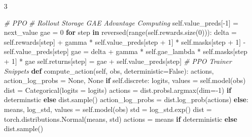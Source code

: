 \documentclass{article}
\newenvironment{Shaded}{\CodeFontSize\setlength{\topsep}{\CodeBlockSkip}\setlength{\partopsep}{0pt}}{}
\newcommand{\BuiltInTok}[1]{\textcolor[rgb]{0.00,0.50,0.00}{#1}}
\newcommand{\CommentTok}[1]{\textcolor[rgb]{0.38,0.63,0.69}{\textit{#1}}}
\newcommand{\ControlFlowTok}[1]{\textcolor[rgb]{0.00,0.44,0.13}{\textbf{#1}}}
\newcommand{\DecValTok}[1]{\textcolor[rgb]{0.25,0.63,0.44}{#1}}
\newcommand{\KeywordTok}[1]{\textcolor[rgb]{0.00,0.44,0.13}{\textbf{#1}}}
\newcommand{\NormalTok}[1]{#1}
\newcommand{\OperatorTok}[1]{\textcolor[rgb]{0.40,0.40,0.40}{#1}}
\newcommand{\VariableTok}[1]{\textcolor[rgb]{0.10,0.09,0.49}{#1}}
\newcommand{\CodeFontSize}{\fontsize{4.8}{5.6}\selectfont}
\newcommand{\NumColumns}{3}  %
\newlength{\CodeBlockSkip}
\begin{document}
\begin{multicols*}{\NumColumns}
\begin{Shaded}
\begin{Highlighting}[]
\CommentTok{\# PPO}
\CommentTok{\# Rollout Storage GAE Advantage Computing}
\VariableTok{self}\NormalTok{.value\_preds[}\OperatorTok{{-}}\DecValTok{1}\NormalTok{] }\OperatorTok{=}\NormalTok{ next\_value}
\NormalTok{gae }\OperatorTok{=} \DecValTok{0}
\ControlFlowTok{for}\NormalTok{ step }\KeywordTok{in} \BuiltInTok{reversed}\NormalTok{(}\BuiltInTok{range}\NormalTok{(}\VariableTok{self}\NormalTok{.rewards.size(}\DecValTok{0}\NormalTok{))):}
\NormalTok{  delta }\OperatorTok{=} \VariableTok{self}\NormalTok{.rewards[step] }\OperatorTok{+}\NormalTok{ gamma }\OperatorTok{*} \VariableTok{self}\NormalTok{.value\_preds[step }\OperatorTok{+} \DecValTok{1}\NormalTok{] }\OperatorTok{*} \VariableTok{self}\NormalTok{.masks[step }\OperatorTok{+} \DecValTok{1}\NormalTok{] }\OperatorTok{{-}} \VariableTok{self}\NormalTok{.value\_preds[step]}
\NormalTok{  gae }\OperatorTok{=}\NormalTok{ delta }\OperatorTok{+}\NormalTok{ gamma }\OperatorTok{*} \VariableTok{self}\NormalTok{.gae\_lambda }\OperatorTok{*} \VariableTok{self}\NormalTok{.masks[step }\OperatorTok{+} \DecValTok{1}\NormalTok{] }\OperatorTok{*}\NormalTok{ gae}
  \VariableTok{self}\NormalTok{.returns[step] }\OperatorTok{=}\NormalTok{ gae }\OperatorTok{+} \VariableTok{self}\NormalTok{.value\_preds[step]}
\CommentTok{\# PPO Trainer Snippets}
\KeywordTok{def}\NormalTok{ compute\_action(}\VariableTok{self}\NormalTok{, obs, deterministic}\OperatorTok{=}\VariableTok{False}\NormalTok{):}
\NormalTok{  actions, action\_log\_probs }\OperatorTok{=} \VariableTok{None}\NormalTok{, }\VariableTok{None}
  \ControlFlowTok{if} \VariableTok{self}\NormalTok{.discrete:}
\NormalTok{    logits, values }\OperatorTok{=} \VariableTok{self}\NormalTok{.model(obs)}
\NormalTok{    dist }\OperatorTok{=}\NormalTok{ Categorical(logits }\OperatorTok{=}\NormalTok{ logits)}
\NormalTok{    actions }\OperatorTok{=}\NormalTok{ dist.probsl.argmax(dim}\OperatorTok{={-}}\DecValTok{1}\NormalTok{) }\ControlFlowTok{if}\NormalTok{ determinstic }\ControlFlowTok{else}\NormalTok{ dist.sample()}
\NormalTok{    action\_log\_probs }\OperatorTok{=}\NormalTok{ dist.log\_prob(actions)}
  \ControlFlowTok{else}\NormalTok{:}
\NormalTok{    means, log\_std, values }\OperatorTok{=} \VariableTok{self}\NormalTok{.model(obs)}
\NormalTok{    std }\OperatorTok{=}\NormalTok{ log\_std.exp()}
\NormalTok{    dist }\OperatorTok{=}\NormalTok{ torch.distributions.Normal(means, std)}
\NormalTok{    actions }\OperatorTok{=}\NormalTok{ means }\ControlFlowTok{if}\NormalTok{ deterministic }\ControlFlowTok{else}\NormalTok{ dist.sample()}

\end{Highlighting}
\end{Shaded}
\end{multicols*}
\end{document}
